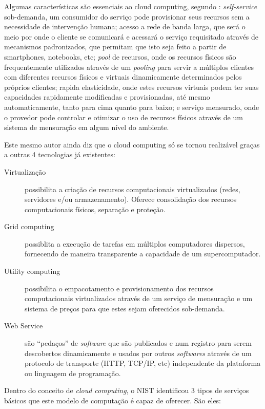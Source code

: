Algumas características são essenciais ao cloud computing, segundo
: \textit{self-service} sob-demanda, um
consumidor do serviço pode provisionar seus recursos sem a necessidade de intervenção
humana; acesso a rede de banda larga, que será o meio por onde o cliente se comunicará e
acessará o serviço requisitado através de mecanismos padronizados, que permitam que isto
seja feito a partir de smartphones, notebooks, etc; \textit{pool} de recursos, onde os recursos
físicos são frequentemente utilizados através de um \textit{pooling} para servir a múltiplos clientes
com diferentes recursos físicos e virtuais dinamicamente determinados pelos próprios clientes;
rapida elasticidade, onde estes recursos virtuais podem ter suas capacidades rapidamente
modificadas e provisionadas, até mesmo automaticamente, tanto para cima quanto para baixo;
e serviço mensurado, onde o provedor pode controlar e otimizar o uso de recursos físicos
através de um sistema de mensuração em algum nível do ambiente.

Este mesmo autor ainda diz que o cloud computing só se tornou realizável graças a
outras 4 tecnologias já existentes:

\begin{description}
    \item[Virtualização] possibilita a criação de recursos computacionais virtualizados
    (redes, servidores e/ou armazenamento). Oferece consolidação dos recursos computacionais
    físicos, separação e proteção.

    \item[Grid computing] possiblita a execução de tarefas em múltiplos computadores
    dispersos, fornecendo de maneira transparente a capacidade de um supercomputador.

    \item[Utility computing] possibilita o empacotamento e provisionamento dos recursos
    computacionais virtualizados através de um serviço de mensuração e um sistema de
    preços para que estes sejam oferecidos sob-demanda.

    \item[Web Service] são ``pedaços'' de \emph{software} que são publicados e num registro
    para serem descobertos dinamicamente e usados por outros \emph{softwares} através de um
    protocolo de transporte (HTTP, TCP/IP, etc) independente da plataforma ou linguagem
    de programação.
\end{description}

Dentro do conceito de \emph{cloud computing}, o NIST identificou 3 tipos de serviços básicos que este
modelo de computação é capaz de oferecer. São eles:

